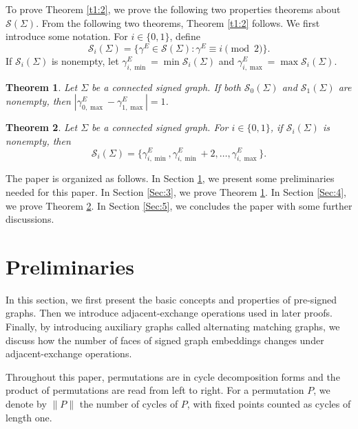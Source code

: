 \documentclass[12pt]{article}
\newtheorem{theorem}{Theorem}[section]
\theoremstyle{definition}
\newcommand{\cS}{\mathcal S}
\begin{document}
To prove Theorem \ref{t1:2}, we prove the following two properties theorems about $\cS(\Sigma)$. From the following two theorems, Theorem \ref{t1:2} follows. We first introduce some notation. For $i\in\{0,1\}$, define $$\cS_i(\Sigma)=\{\gamma^E\in\cS(\Sigma):\gamma^E\equiv i\pmod2\}.$$ If $\cS_i(\Sigma)$ is nonempty, let $\gamma_{i,\min}^E=\min\cS_i(\Sigma)$ and $\gamma_{i,\max}^E=\max\cS_i(\Sigma)$.

\begin{theorem}\label{t1:3}
Let $\Sigma$ be a connected  signed graph. If both $\cS_0(\Sigma)$ and $\cS_1(\Sigma)$ are nonempty, then $\left|\gamma_{0,\max}^E-\gamma_{1,\max}^E\right|=1$.
\end{theorem}

\begin{theorem}\label{t1:4}
Let $\Sigma$ be a connected  signed graph. For $i\in\{0,1\}$, if $\cS_i(\Sigma)$ is nonempty, then
$$\cS_i(\Sigma)=\{\gamma_{i,\min}^E,\gamma_{i,\min}^E+2,\ldots,\gamma_{i,\max}^E\}.$$
\end{theorem}

The paper is organized as follows. In Section \ref{Sec:2}, we present some preliminaries needed for this paper.
In Section \ref{Sec:3}, we prove Theorem \ref{t1:3}.
In Section \ref{Sec:4}, we prove Theorem \ref{t1:4}. In Section \ref{Sec:5}, we concludes the paper with some further discussions.

\section{Preliminaries}\label{Sec:2}
In this section, we first present the basic concepts and properties of pre-signed graphs. Then we introduce adjacent-exchange operations used in later proofs. Finally, by introducing auxiliary graphs called alternating matching graphs, we discuss how the number of faces of signed graph embeddings changes under adjacent-exchange operations.

Throughout this paper, permutations are in cycle decomposition forms and the
product of permutations are read from left to right. For a permutation $P$, we denote by $\lVert P\rVert$ the number of cycles of $P$, with fixed points counted as cycles of length one.
\end{document}
